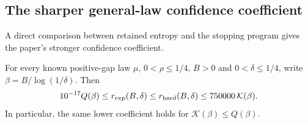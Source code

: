 \clearpage
\subsection{The sharper general-law confidence coefficient}
\label{sec:entropy-confidence}

A direct comparison between retained entropy and the stopping
program gives the paper's stronger confidence coefficient.

\begin{theorem}
\label{thm:entropy-confidence-explicit}
For every known positive-gap law $\mu$, $0<\rho\le1/4$,
$B>0$ and $0<\delta\le1/4$, write $\beta=B/\log(1/\delta)$.
Then
\[
 10^{-17}Q(\beta)\le r_{\rm exp}(B,\delta)
 \le r_{\rm hard}(B,\delta)\le750000\,\mathcal K(\beta).
\]
In particular, the same lower coefficient holds for
$\mathcal K(\beta)\le Q(\beta)$.
\end{theorem}

